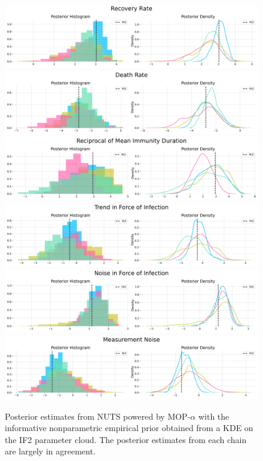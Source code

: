 \begin{figure}[H]
    \centering
    \includegraphics[scale=0.3]{imgs/pmcmc/nuts_eb/Recovery Rate.png}
    \includegraphics[scale=0.3]{imgs/pmcmc/nuts_eb/Death Rate.png}
    \includegraphics[scale=0.3]{imgs/pmcmc/nuts_eb/Reciprocal of Mean Immunity Duration.png}
    \includegraphics[scale=0.3]{imgs/pmcmc/nuts_eb/Trend in Force of Infection.png}
    \includegraphics[scale=0.3]{imgs/pmcmc/nuts_eb/Noise in Force of Infection.png}
    \includegraphics[scale=0.3]{imgs/pmcmc/nuts_eb/Measurement Noise.png}
    \caption{Posterior estimates from NUTS powered by MOP-$\alpha$ with the informative nonparametric empirical prior obtained from a KDE on the IF2 parameter cloud. The posterior estimates from each chain are largely in agreement.}
    \label{fig:posteriors}
\end{figure}


